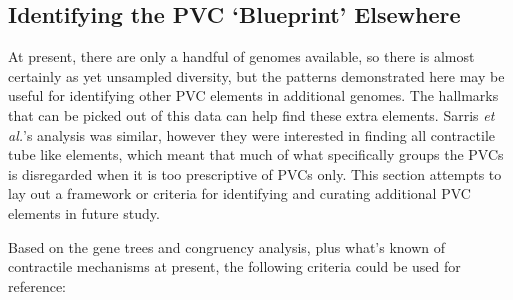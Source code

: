 \subsection{Identifying the PVC `Blueprint' Elsewhere}
At present, there are only a handful of \Pa{} genomes available, so there is almost certainly as yet unsampled diversity, but the patterns demonstrated here may be useful for identifying other PVC elements in additional genomes. The hallmarks that can be picked out of this data can help find these extra elements. Sarris \emph{et al.}'s analysis was similar, however they were interested in finding all contractile tube like elements, which meant that much of what specifically groups the PVCs is disregarded when it is too prescriptive of PVCs only. This section attempts to lay out a framework or criteria for identifying and curating additional PVC elements in future study.

Based on the gene trees and congruency analysis, plus what's known of contractile mechanisms at present, the following criteria could be used for reference:

